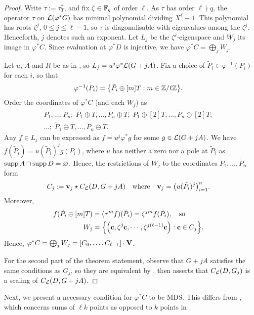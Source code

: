 \documentclass[twocolumn, 11pt]{scrartcl}
\begin{document}
\begin{proof}
    Write $\tau:=\tau_T^*$, and fix $\zeta\in\mathbb{F}_q$ of order $\ell$. As $\tau$ has order $\ell\nmid q$, the operator $\tau$ on $\mathcal{L}(\varphi^*G)$ has minimal polynomial dividing $X^\ell-1$. This polynomial has roots $\zeta^j$, $0\leq j\leq\ell-1$, so $\tau$ is diagonalisable with eigenvalues among the $\zeta^j$. Henceforth, $j$ denotes such an exponent. Let $L_j$ be the $\zeta^j$-eigenspace and $W_j$ its image in $\varphi^*C$. Since evaluation at $\varphi^*D$ is injective, we have $\varphi^*C=\bigoplus_j W_j$.

    Let $u$, $A$ and $R$ be as in , so $L_j=u^j\varphi^*\mathcal{L}(G+jA)$. Fix a choice of $\tilde P_i\in\varphi^{-1}(P_i)$ for each $i$, so that
    \[ \varphi^{-1}(P_i)=\set*{\tilde P_i\oplus[m]T:m\in\bbZ/\ell\bbZ}. \]
    Order the coordinates of $\varphi^*C$ (and each $W_j$) as
    \begin{align*}
    \tilde P_1,\hdots,\tilde P_n;\;\tilde P_1\oplus T,\hdots,\tilde P_n\oplus T;\;
    \tilde P_1\oplus [2]T,\hdots,\tilde P_n\oplus [2]T;\\
    \hdots;\;\tilde P_1\ominus T,\hdots,\tilde P_n\ominus T.
    \end{align*}
    Any $f\in L_j$ can be expressed as $f=u^j\varphi^*g$ for some $g\in\mathcal{L}(G+jA)$. We have $f(\tilde P_i)=u(\tilde P_i)^jg(P_i)$, where $u$ has neither a zero nor a pole at $\tilde P_i$ as $\operatorname{supp} A\cap\operatorname{supp} D=\varnothing$. Hence, the restrictions of $W_j$ to the coordinates $\tilde P_1,\hdots,\tilde P_n$ form
    \[ C_j:=\bfv_j\star C_\mcL(D,G+jA) \qwhr \bfv_j=\pa*{u(\tilde P_i)^j}_{i=1}^n.\]
    Moreover,
    \begin{align*}
        f(\tilde P_i\oplus[m]T)&=(\tau^mf)(\tilde P_i)=\zeta^{jm}f(\tilde P_i),\quad\text{so} \\
        W_j&=\set*{\pa*{\bfc,\zeta^j\bfc,\cdots,\zeta^{j(\ell-1)}\bfc}:\bfc\in C_j}.
    \end{align*}
    Hence, $\varphi^*C=\bigoplus_jW_j=[C_0,\hdots,C_{\ell-1}]\cdot\mathbf{V}$.
    
    For the second part of the theorem statement, observe that $G+jA$ satisfies the same conditions as $G_j$, so they are equivalent by .  then asserts that $C_\mathcal{L}(D,G_j)$ is a scaling of $C_\mathcal{L}(D,G+jA)$.
\end{proof}

Next, we present a necessary condition for $\varphi^*C$ to be MDS. This differs from , which concerns sums of $\ell k$ points as opposed to $k$ points in .
\end{document}

